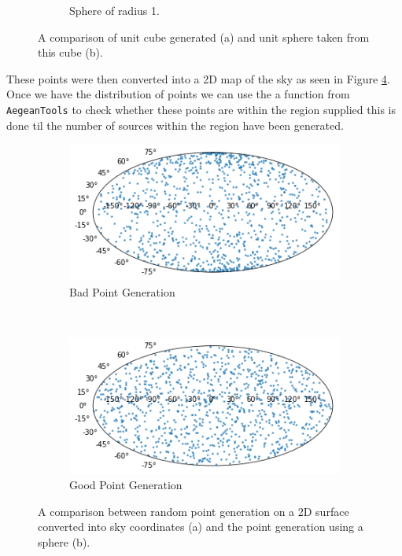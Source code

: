 \documentclass[a4paper]{article}
\begin{document}
\begin{figure}[H]
\begin{subfigure}[t]{0.5\textwidth}
        \caption{Sphere of radius 1.}
    \end{subfigure}
    \caption{A comparison of unit cube generated (a) and unit sphere taken from this cube (b).}
    \label{fig:cub+sph}
\end{figure}

These points were then converted into a 2D map of the sky as seen in Figure \ref{fig:gpoint}. Once we have the distribution of points we can use the a function from \texttt{AegeanTools} \citet{Aegean} to check whether these points are within the region supplied this is done til the number of sources within the region have been generated.\\
\begin{figure}[H]
    \centering
    \begin{subfigure}[t]{0.5\textwidth}
        \centering
        \includegraphics[width=\textwidth, right]{map_bad.png}
        \caption{Bad Point Generation}
        \label{fig:bpoint}
    \end{subfigure}%
    ~ 
    \begin{subfigure}[t]{0.5\textwidth}
        \centering
        \includegraphics[width=\textwidth, left]{map_good.png}
        \caption{Good Point Generation}
        \label{fig:gpoint}
    \end{subfigure}
    \caption{A comparison between random point generation on a 2D surface converted into sky coordinates (a) and the point generation using a sphere (b).}
\end{figure}
\end{document}
